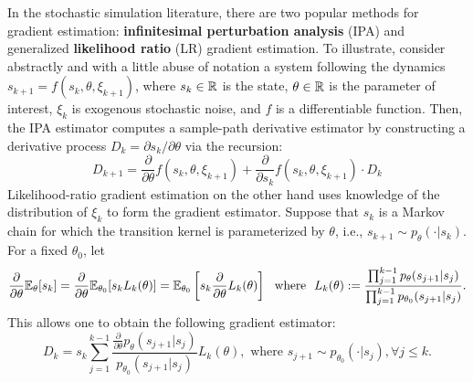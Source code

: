In the stochastic simulation literature, there are two popular methods for gradient estimation: {\bf infinitesimal perturbation analysis} (IPA) and generalized {\bf likelihood ratio} (LR) gradient estimation.
To illustrate, consider abstractly and with a little abuse of notation a system following the dynamics $s_{k+1} = f(s_{k}, \theta, \xi_{k+1})$, where $s_k \in \mathbb{R}$ is the state, $\theta \in \mathbb{R}$ is the parameter of interest,  $\xi_{k}$ is exogenous stochastic noise, and $f$ is a differentiable function. Then, the IPA estimator computes a sample-path derivative estimator
by constructing a derivative process $D_{k}=\partial s_{k} / \partial\theta$ via the recursion:
\[
    D_{k+1} = \frac{\partial}{\partial \theta} f(s_{k}, \theta, \xi_{k+1}) + \frac{\partial}{\partial s_{k}} f(s_{k}, \theta, \xi_{k+1}) \cdot D_{k}
    \tag{IPA}
\]
Likelihood-ratio gradient estimation on the other hand uses knowledge of the distribution of $\xi_{k}$ to form the gradient estimator. Suppose that $s_{k}$ is a Markov chain for which the transition kernel is parameterized by $\theta$, i.e., $s_{k+1} \sim p_{\theta}(\cdot |s_{k})$. %
For a fixed $\theta_{0}$, let 
\[
\frac{\partial}{\partial \theta}\mathbb{E}_{\theta}[s_{k}] = \frac{\partial}{\partial \theta}\mathbb{E}_{\theta_{0}}[s_{k}L_{k}(\theta)] = \mathbb{E}_{\theta_{0}}\left[s_{k}\frac{\partial}{\partial \theta}L_{k}(\theta)\right]
~~\mbox{where}~~L_{k}(\theta) := \frac{\prod_{j=1}^{k-1} p_{\theta}(s_{j+1}|s_{j})}{\prod_{j=1}^{k-1} p_{\theta_0}(s_{j+1}|s_{j})}.
\]
This allows one to obtain the following gradient estimator:
\[
D_{k} = s_{k} \sum_{j=1}^{k-1} 
\frac{\frac{\partial}{\partial \theta}p_{\theta}(s_{j+1}|s_{j})}
{p_{\theta_{0}}(s_{j+1}|s_{j})}L_{k}(\theta), \mbox{ where } s_{j+1} \sim p_{\theta_{0}}(\cdot|s_{j}),\forall j \leq k.
\tag{LR}
\]

